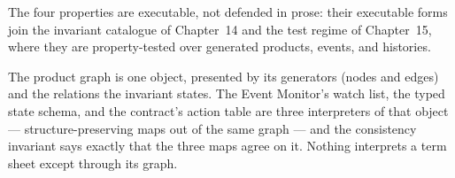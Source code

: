 The four properties are executable, not defended in prose: their executable forms join
the invariant catalogue of Chapter~14 and the test regime of Chapter~15, where they are
property-tested over generated products, events, and histories.

\begin{secondtelling}
The product graph is one object, presented by its generators (nodes and edges) and the
relations the invariant states. The Event Monitor's watch list, the typed state schema,
and the contract's action table are three interpreters of that object ---
structure-preserving maps out of the same graph --- and the consistency invariant says
exactly that the three maps agree on it. Nothing interprets a term sheet except through
its graph.
\end{secondtelling}
